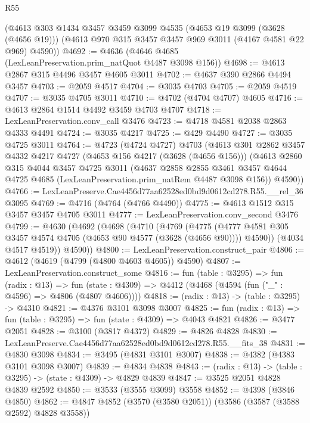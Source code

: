 \begin{lexlean}{R55}
\begin{coremodule}
    (@4613
      @303
      @1434
      @3457
      @3459
      @3099
      @4535
      (@4653 @19 @3099 (@3628 (@4656 @19)))
      (@4613 @970 @315 @3457 @3457 @969 @3011 (@4167 @4581 @22 @969) @4590))
@4692 := @4636 (@4646 @4685 (LexLeanPreservation.prim_natQuot @4487 @3098 @156))
@4698 := @4613 @2867 @315 @4496 @3457 @4605 @3011
@4702 := @4637 @390 @2866 @4494 @3457
@4703 := @2059 @4517
@4704 := @3035 @4703
@4705 := @2059 @4519
@4707 := @3035 @4705 @3011
@4710 := @4702 (@4704 @4707) @4605
@4716 := @4613 @2864 @1514 @4492 @3459 @4703 @4707
@4718 := LexLeanPreservation.conv_call @3476
@4723 := @4718 @4581 @2038 @2863 @4333 @4491
@4724 := @3035 @4217
@4725 := @429 @4490
@4727 := @3035 @4725 @3011
@4764 := @4723
    (@4724 @4727)
    @4703
    (@4613
      @301
      @2862
      @3457
      @4332
      @4217
      @4727
      (@4653 @156 @4217 (@3628 (@4656 @156)))
      (@4613
        @2860
        @315
        @4044
        @3457
        @4725
        @3011
        (@4637
          @2858
          @2855
          @3461
          @3457
          @4644
          @4725
          @4685
          (LexLeanPreservation.prim_natRem @4487 @3098 @156))
        @4590))
@4766 := LexLeanPreserve.Cae4456d77aa62528ed0bd9d0612cd278.R55.__rel_36 @3095
@4769 := @4716 (@4764 (@4766 @4490))
@4775 := @4613 @1512 @315 @3457 @3457 @4705 @3011
@4777 := LexLeanPreservation.conv_second @3476
@4799 := @4630
    (@4692
      (@4698
        (@4710
          (@4769
            (@4775
              (@4777 @4581 @305 @3457 @4574 @4705 (@4653 @90 @4577 (@3628 (@4656 @90))))
              @4590))
          (@4034 @4517 @4519))
        @4590))
@4800 := LexLeanPreservation.construct_pair
@4806 := @4612 (@4619 (@4799 (@4800 @4603 @4605)) @4590)
@4807 := LexLeanPreservation.construct_some
@4816 := fun (table : @3295) =>
  fun (radix : @13) =>
  fun (state : @4309) => @4412 (@4468 (@4594 (fun ("_" : @4596) => @4806 (@4807 @4606))))
@4818 := (radix : @13) -> (table : @3295) -> @4310
@4821 := @4376 @3101 @3098 @3007
@4825 := fun (radix : @13) => fun (table : @3295) => fun (state : @4309) => @4043 @4821
@4826 := @3477 @2051
@4828 := @3100 (@3817 @4372)
@4829 := @4826 @4828
@4830 := LexLeanPreserve.Cae4456d77aa62528ed0bd9d0612cd278.R55.__fits_38
@4831 := @4830 @3098
@4834 := @3495 (@4831 @3101 @3007)
@4838 := @4382 (@4383 @3101 @3098 @3007)
@4839 := @4834 @4838
@4843 := (radix : @13) -> (table : @3295) -> (state : @4309) -> @4829 @4839
@4847 := @3525 @2051 @4828 @4839 @2592
@4850 := @3533 (@3555 @3099) @3558
@4852 := @4398 (@3846 @4850)
@4862 := @4847 @4852 (@3570 (@3580 @2051)) (@3586 (@3587 (@3588 @2592) @4828 @3558))

\end{coremodule}
\end{lexlean}
